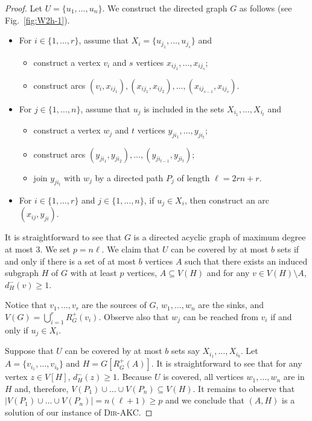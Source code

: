 \documentclass[11pt,a4paper]{article}
\newcommand{\DAKC}{\textsc{Dir-AKC}\xspace}
\begin{document}
\begin{proof}
Let $U=\{u_1,\ldots,u_n\}$. We construct the directed graph $G$ as follows (see Fig.~\ref{fig:W2h-1}).
\begin{itemize}
\item For $i\in\{1,\dots,r\}$, assume that $X_i=\{u_{j_1},\ldots,u_{j_s}\}$ and
\begin{itemize}
\item construct a vertex $v_i$ and $s$ vertices $x_{ij_1},\ldots,x_{ij_s}$;
\item construct arcs $(v_i,x_{ij_1}),(x_{ij_1},x_{ij_2}),\ldots,(x_{ij_{s-1}},x_{ij_s})$.
\end{itemize}
\item For $j\in\{1,\ldots,n\}$, assume that $u_j$ is included in the sets $X_{i_1},\ldots,X_{i_t}$ and
\begin{itemize}
\item construct a vertex $w_j$ and $t$ vertices $y_{ji_1},\ldots,y_{ji_t}$;
\item construct arcs $(y_{ji_1},y_{ji_2}),\ldots,(y_{ji_{t-1}},y_{ji_t})$;
\item join $y_{ji_t}$ with $w_j$ by a directed path $P_j$ of length $\ell=2rn+r$.
\end{itemize}
\item For $i\in\{1,\dots,r\}$ and $j\in\{1,\ldots,n\}$, if $u_j\in X_i$, then construct an arc $(x_{ij},y_{ji})$.
\end{itemize}
It is straightforward to see that $G$ is a directed acyclic graph of maximum degree at most 3. We set $p=n \ell$. We claim
that $U$ can be covered by at most $b$ sets if and only if there is a set of at most $b$ vertices $A$ such that there exists
an induced subgraph $H$ of $G$ with at least $p$ vertices, $A\subseteq V(H)$ and for any $v\in V(H)\setminus A$, $d_H^-(v)\geq
1$.

Notice that $v_1,\ldots,v_r$ are the sources of $G$, $w_1,\ldots,w_n$ are the sinks, and $V(G)=\bigcup_{i=1}^rR_{G}^+(v_i)$.
Observe also that $w_j$ can be reached from $v_i$ if and only if $u_j\in X_i$.

Suppose that $U$ can be covered by at most $b$ sets say $X_{i_1},\ldots,X_{i_{b}}$. Let $A=\{v_{i_1},\ldots,v_{i_{b}}\}$ and
$H=G[R_{G}^+(A)]$. It is straightforward to see that for any vertex $z\in V[H]$, $d_{H}^-(z)\geq 1$. Because $U$ is covered,
all vertices $w_1,\ldots,w_n$ are in $H$ and, therefore, $V(P_1)\cup\ldots\cup V(P_n)\subseteq V(H)$. It remains to observe
that $|V(P_1)\cup\ldots\cup V(P_n)|=n(\ell+1)\geq p$ and we conclude that $(A,H)$ is a solution of our instance of \DAKC.


\end{proof}
\end{document}
